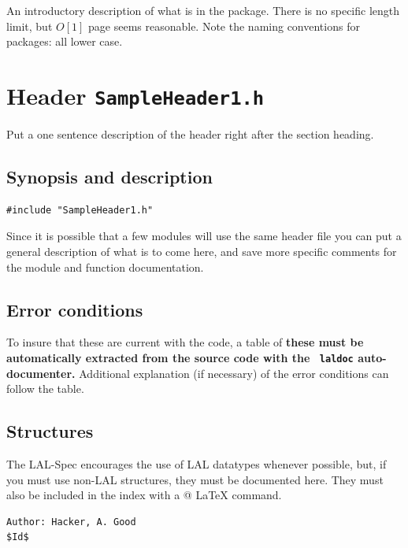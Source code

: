 \documentclass[oneside]{book}
\begin{document}
An introductory description of what is in the package.
There is no specific length limit, but $O[1]$ page seems
reasonable. Note the naming conventions for packages: all lower case. 


\newpage

\section{Header {\texttt {SampleHeader1.h}}}
Put a one sentence description of the header right after the section
heading.

\subsection*{Synopsis and description}

\begin{verbatim}
#include "SampleHeader1.h"
\end{verbatim}
Since it is possible that a few modules will use the same header file
you can put a general description of what is to come here, and save
more specific comments for the module and function documentation.

\subsection*{Error conditions}
To insure that these are current with the code, a table of {\bf these
must be automatically extracted from the source code with the {\tt
laldoc} auto-documenter.} Additional explanation (if necessary) of the
error conditions can follow the table.

\subsection*{Structures}

The LAL-Spec encourages the use of LAL datatypes whenever possible,
but, if you must use  non-LAL structures, they must be documented
here.  They must also be included in the index with a
\verb@{}@ {\LaTeX} command.

\vfill{
\footnotesize{
\vspace{-1ex}
\mbox{}
\vspace{-3ex}
\begin{verbatim}
Author: Hacker, A. Good
$Id$
\end{verbatim}
}
}
\end{document}
